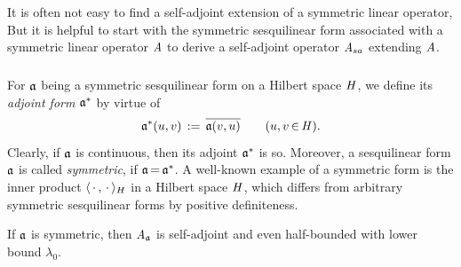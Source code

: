 \documentclass[11pt,twoside]{article}
\begin{document}
\subsubsection*{} %
It is often not easy to find a self-adjoint extension
of a symmetric linear operator,
But it is helpful to start with the symmetric sesquilinear form
associated with a symmetric linear operator $\mathit{A}$
to derive a self-adjoint operator $\mathit{A}_{sa}$ extending $\mathit{A}$.

\subparagraph*{}
For $\mathfrak{a}$ being a symmetric sesquilinear form on a Hilbert space $\mathit{H}$,
we define its \textit{adjoint form} $\mathfrak{a}^*$ by virtue of
\[
\mathfrak{a}^* (u,v) \,:=\, \overline{\mathfrak{a}(v,u)}
\quad \quad (u,v {\,\in\,} \mathit{H}).
\]
Clearly,
if $\mathfrak{a}$ is continuous,
then its adjoint $\mathfrak{a}^*$ is so.
Moreover,
a sesquilinear form $\mathfrak{a}$ is called \textit{symmetric},
if $\mathfrak{a} {\,=\,} \mathfrak{a}^*$.
A well-known example of a symmetric form is the inner product
$\langle \,\cdot\,,\,\cdot\, \rangle_H$ in a Hilbert space $\mathit{H}$,
which differs from arbitrary symmetric sesquilinear forms
by {positive definiteness}.

\begin{theorem}
If $\mathfrak{a}$ is symmetric,
then $\mathit{A}_{\mathfrak{a}}$ is self-adjoint
and even half-bounded with lower bound $\lambda_0$.
\end{theorem}
\end{document}
